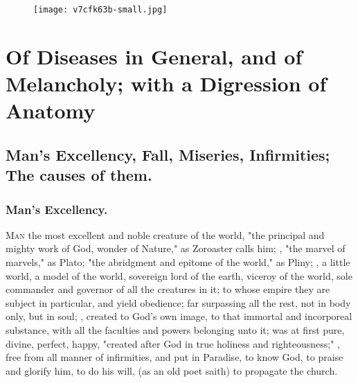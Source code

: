 \cleartoleftpage{}
\begin{figure}[p]
  \begingroup
  \centering
  \texttt{[image: v7cfk63b-small.jpg]}
  \label{fig:deathlooms}
\end{figure}
\clearpage{}
\chapter[Of Diseases and Melancholy]{Of Diseases in General, and of Melancholy; with a Digression of Anatomy}
\section[Man's Excellency, Fall, Miseries]{Man's Excellency, Fall, Miseries, Infirmities; The causes of them.}

\subsection{Man's Excellency.}

\lettrine[lines=4,findent=5pt,nindent=0pt]{M}{an} the most excellent and noble
creature of the world, "the principal and mighty work of God, wonder of
Nature," as Zoroaster calls him; , "the
marvel of marvels," as Plato; "the
abridgment and epitome of the world," as Pliny;
, a little world, a model of the world,
sovereign lord of the earth, viceroy of the world, sole
commander and governor of all the creatures in it; to whose empire they are
subject in particular, and yield obedience; far surpassing all the rest, not in
body only, but in soul; ,
created to God's own image, to that
immortal and incorporeal substance, with all the faculties and powers belonging
unto it; was at first pure, divine, perfect, happy,
"created after God in true holiness and righteousness;"
, free from all manner of infirmities, and put in Paradise,
to know God, to praise and glorify him, to do his will,  (as an old poet saith) to propagate the church.

